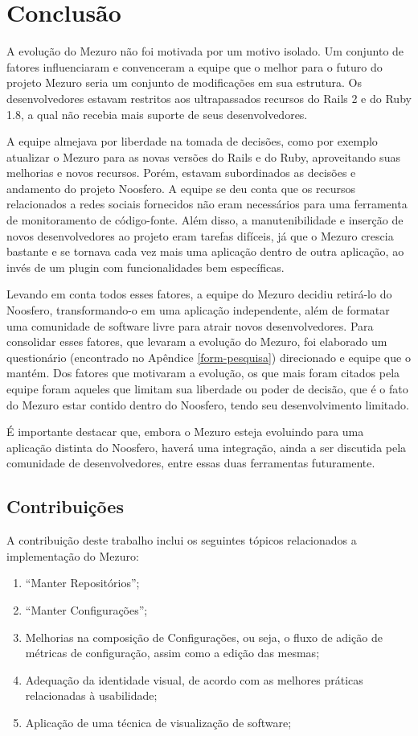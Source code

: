 \chapter{Conclusão}

A evolução do Mezuro não foi motivada por um motivo isolado. Um conjunto de fatores influenciaram e convenceram a equipe que o melhor para o futuro do projeto Mezuro seria um conjunto de modificações em sua estrutura. Os desenvolvedores estavam restritos aos ultrapassados recursos do Rails 2 e do Ruby 1.8, a qual não recebia mais suporte de seus desenvolvedores.

A equipe almejava por liberdade na tomada de decisões, como por exemplo atualizar o Mezuro para as novas versões do Rails e do Ruby, aproveitando suas melhorias e novos recursos. Porém, estavam subordinados as decisões e andamento do projeto Noosfero. A equipe se deu conta que os recursos relacionados a redes sociais fornecidos não eram necessários para uma ferramenta de monitoramento de código-fonte. Além disso, a manutenibilidade e inserção de novos desenvolvedores ao projeto eram tarefas difíceis, já que o Mezuro crescia bastante e se tornava cada vez mais uma aplicação dentro de outra aplicação, ao invés de um plugin com funcionalidades bem específicas.

Levando em conta todos esses fatores, a equipe do Mezuro decidiu retirá-lo do Noosfero, transformando-o em uma aplicação independente, além de formatar uma comunidade de software livre para atrair novos desenvolvedores. Para consolidar esses fatores, que levaram a evolução do Mezuro, foi elaborado um questionário (encontrado no Apêndice \ref{form-pesquisa}) direcionado e equipe que o mantém. Dos fatores que motivaram a evolução, os que mais foram citados pela equipe foram aqueles que limitam sua liberdade ou poder de decisão, que é o fato do Mezuro estar contido dentro do Noosfero, tendo seu desenvolvimento limitado.

É importante destacar que, embora o Mezuro esteja evoluindo para uma aplicação distinta do Noosfero, haverá uma integração, ainda a ser discutida pela comunidade de desenvolvedores, entre essas duas ferramentas futuramente.

\section{Contribuições}

A contribuição deste trabalho inclui os seguintes tópicos relacionados a implementação do Mezuro:
\begin{enumerate}
\item ``Manter Repositórios'';
\item ``Manter Configurações'';
\item Melhorias na composição de Configurações, ou seja, o fluxo de adição de métricas de configuração, assim como a edição das mesmas;
\item Adequação da identidade visual, de acordo com as melhores práticas relacionadas à usabilidade;
\item Aplicação de uma técnica de visualização de software;
\end{enumerate}

